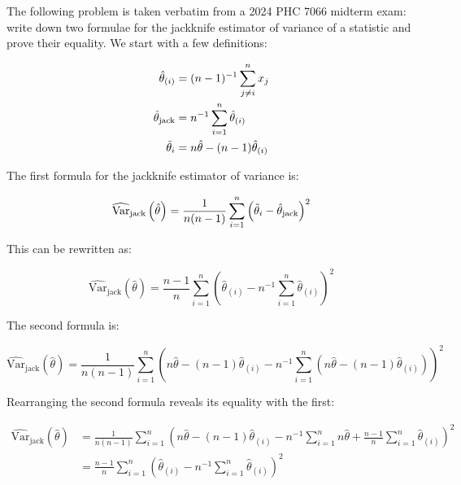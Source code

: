 \documentclass{report}
\begin{document}
The following problem is taken verbatim from a 2024 PHC 7066 midterm exam: write down two formulae for the jackknife estimator of variance of a statistic and prove their equality. We start with a few definitions:

\begin{equation}\label{eq:ex-lst-jackknife-defs}
    \begin{aligned}
        \hat{\theta}_{(i)} &= (n-1)^{-1} \sum_{j \neq i}^n x_j \\
        \hat{\theta}_{\text{jack}} &= n^{-1} \sum_{i=1}^n \hat{\theta}_{(i)} \\
        \Tilde{\theta}_i &= n\hat{\theta} - (n-1)\hat{\theta}_{(i)} \\
    \end{aligned}
\end{equation}

The first formula for the jackknife estimator of variance is:

\begin{equation}\label{eq:ex-lst-jackknife-variance-estimator-1}
    \widehat{\text{Var}}_{\text{jack}}\left(\hat{\theta}\right) = \frac{1}{n(n-1)} \sum_{i=1}^n \left(\Tilde{\theta}_i - \hat{\theta}_{\text{jack}}\right)^2
\end{equation}

This can be rewritten as:

\begin{equation}\label{eq:ex-lst-jackknife-variance-estimator-1-reformulated}
    \widehat{\text{Var}}_{\text{jack}}\left(\hat{\theta}\right) = \frac{n-1}{n} \sum_{i=1}^n \left(\hat{\theta}_{(i)} - n^{-1}\sum_{i=1}^n \hat{\theta}_{(i)}\right)^2
\end{equation}

The second formula is:

\begin{equation}\label{eq:ex-lst-jackknife-variance-estimator-2}
    \widehat{\text{Var}}_{\text{jack}}\left(\hat{\theta}\right) = \frac{1}{n(n-1)} \sum_{i=1}^n \left(n\hat{\theta} - (n-1)\hat{\theta}_{(i)} -n^{-1}\sum_{i=1}^n \left(n\hat{\theta} - (n-1)\hat{\theta}_{(i)}\right)\right)^2
\end{equation}

Rearranging the second formula reveals its equality with the first:

\begin{equation}\label{eq:ex-lst-jackknife-variance-estimator-2-reformulated}
    \begin{aligned}
        \widehat{\text{Var}}_{\text{jack}}\left(\hat{\theta}\right)
          &= \frac{1}{n(n-1)} \sum_{i=1}^n \left(n\hat{\theta} - (n-1)\hat{\theta}_{(i)} -n^{-1}\sum_{i=1}^n n\hat{\theta} + \frac{n-1}{n}\sum_{i=1}^n \hat{\theta}_{(i)}\right)^2 \\
          &= \frac{n-1}{n} \sum_{i=1}^n \left(\hat{\theta}_{(i)} - n^{-1}\sum_{i=1}^n \hat{\theta}_{(i)}\right)^2 \\
    \end{aligned}
\end{equation}
\end{document}
